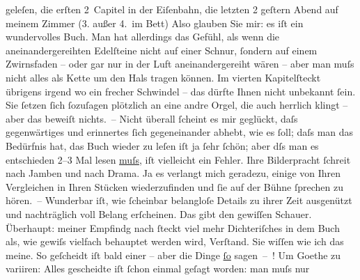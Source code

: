 \begin{ledgroupsized}[t]{13cm}
               geleſen, die erſten 2 Capitel in der Eiſenbahn, die letzten 2 geſtern Abend auf
               meinem Zimmer (3. außer 4. im Bett) Also glauben Sie mir: es iſt ein
               wundervolles Buch. Man hat
               allerdings das Gefühl, als wenn die aneinandergereihten Edelſteine nicht auf einer
               Schnur, {\pb}ſondern auf einem Zwirnsfaden – oder gar nur
               in der Luft aneinandergereiht wären – aber man muſs nicht alles als Kette um den Hals
               tragen können. Im vierten Kapitelſteckt übrigens irgend wo ein frecher Schwindel –
               das dürfte Ihnen nicht unbekannt ſein. Sie ſetzen ſich ſozuſagen plötzlich an eine
               andre Orgel, die auch herrlich klingt – {\pb}aber das
               beweiſt nichts. – Nicht überall ſcheint es mir geglückt, daſs gegenwärtiges und
               erinnertes ſich gegeneinander abhebt, wie es ſoll; daſs man das Bedürfnis hat, das
                  Buch wieder zu leſen  iſt ja ſehr ſchön; aber dſs man es entschieden
               2–3 Mal lesen \uline{muſs}, iſt vielleicht ein Fehler. Ihre
               Bilderpracht ſchreit nach Jamben {\pb}und nach Drama. Ja
               es verlangt mich geradezu, einige von Ihren Vergleichen in Ihren Stücken
               wiederzufinden und ſie auf der Bühne ſprechen zu hören. – Wunderbar iſt, wie
               ſcheinbar belangloſe Details zu ihrer Zeit ausgenützt und nachträglich voll Belang
               erſcheinen. Das gibt den gewiſſen Schauer. Überhaupt: meiner {\pb}Empfindg nach ſteckt viel mehr Dichteriſches in dem
                  Buch als, wie gewiſs vielfach
               behauptet werden wird, Verſtand. Sie wiſſen wie ich das meine. So geſcheidt iſt bald
               einer – aber die Dinge \uline{ſo} sagen – ! Um Goethe zu variiren: Alles gescheidte iſt ſchon einmal geſagt worden: man muſs nur

\end{ledgroupsized}
